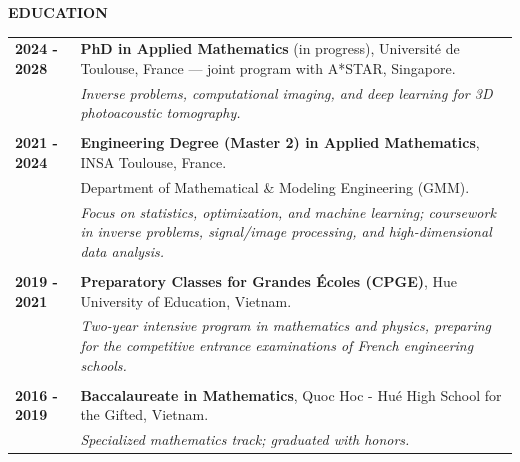 \documentclass[a4paper,10pt]{article}
\begin{document}
\bigskip
\begin{center}\begin{large}
\textbf{EDUCATION}
\end{large}\end{center}
\medskip
\begin{tabular}{p{2.2cm}p{13.8cm}}
    {\bf 2024 - 2028} & {\bf PhD in Applied Mathematics} (in progress), Université de Toulouse, France --- joint program with A*STAR, Singapore. \\
    & \emph{Inverse problems, computational imaging, and deep learning for 3D photoacoustic tomography.} \\
    \vspace{0.1cm}\\
    {\bf 2021 - 2024} & {\bf Engineering Degree (Master 2) in Applied Mathematics}, INSA Toulouse, France. \\
    & Department of Mathematical \& Modeling Engineering (GMM). \\
    & \emph{Focus on statistics, optimization, and machine learning; coursework in inverse problems, signal/image processing, and high-dimensional data analysis.} \\
    \vspace{0.1cm}\\
    {\bf 2019 - 2021} & {\bf Preparatory Classes for Grandes Écoles (CPGE)}, Hue University of Education, Vietnam. \\
    & \emph{Two-year intensive program in mathematics and physics, preparing for the competitive entrance examinations of French engineering schools.} \\
    \vspace{0.1cm}\\
    {\bf 2016 - 2019} & {\bf Baccalaureate in Mathematics}, Quoc Hoc - Hué High School for the Gifted, Vietnam. \\
    & \emph{Specialized mathematics track; graduated with honors.}
\end{tabular}

\bigskip
\end{document}
